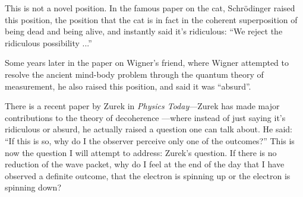 \documentclass[twocolumn,prb]{revtex4}
\begin{document}
This is not a novel position.  In the famous paper on the cat, Schrödinger\cite{schroedinger35naturwissenschaften807} raised this position, the position that the cat is in fact in the coherent superposition of being dead and being alive, and instantly said it's ridiculous: ``We reject the ridiculous possibility ...''

Some years later in the paper on Wigner's friend, where Wigner\cite{Wigner61} attempted to resolve the ancient mind-body problem through the quantum theory of measurement, he also raised this position, and said it was ``absurd''.

There is a recent paper by Zurek \cite{zurek91pt9} in \emph{Physics Today}---Zurek has made major contributions to the theory of decoherence%
---where instead of just saying it's ridiculous or absurd, he actually raised a question one can talk about. He said: ``If this is so, why do I the observer perceive only one of the outcomes?'' This is now the question I will attempt to address: Zurek's question. If there is no reduction of the wave packet, why do I feel at the end of the day that I have observed a definite outcome, that the electron is spinning up or the electron is spinning down?
\end{document}
